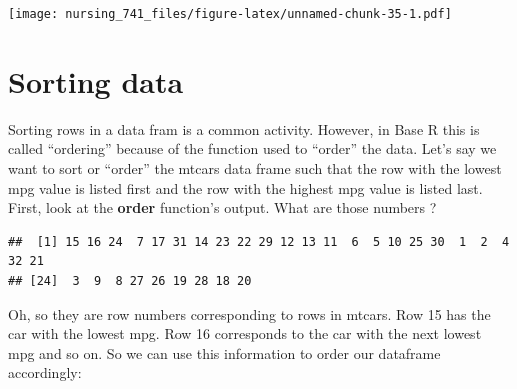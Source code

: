 \documentclass[]{book}
\newenvironment{Shaded}{\begin{snugshade}}{\end{snugshade}}
\newcommand{\KeywordTok}[1]{\textcolor[rgb]{0.13,0.29,0.53}{\textbf{#1}}}
\newcommand{\OperatorTok}[1]{\textcolor[rgb]{0.81,0.36,0.00}{\textbf{#1}}}
\newcommand{\NormalTok}[1]{#1}
\begin{document}
\texttt{[image: nursing\_741\_files/figure-latex/unnamed-chunk-35-1.pdf]}

\section{Sorting data}\label{sorting-data}

Sorting rows in a data fram is a common activity. However, in Base R
this is called ``ordering'' because of the function used to ``order''
the data. Let's say we want to sort or ``order'' the mtcars data frame
such that the row with the lowest mpg value is listed first and the row
with the highest mpg value is listed last. First, look at the
\textbf{order} function's output. What are those numbers ?

\begin{Shaded}
\end{Shaded}

\begin{verbatim}
##  [1] 15 16 24  7 17 31 14 23 22 29 12 13 11  6  5 10 25 30  1  2  4 32 21
## [24]  3  9  8 27 26 19 28 18 20
\end{verbatim}

Oh, so they are row numbers corresponding to rows in mtcars. Row 15 has
the car with the lowest mpg. Row 16 corresponds to the car with the next
lowest mpg and so on. So we can use this information to order our
dataframe accordingly:

\begin{Shaded}
\end{Shaded}
\end{document}
